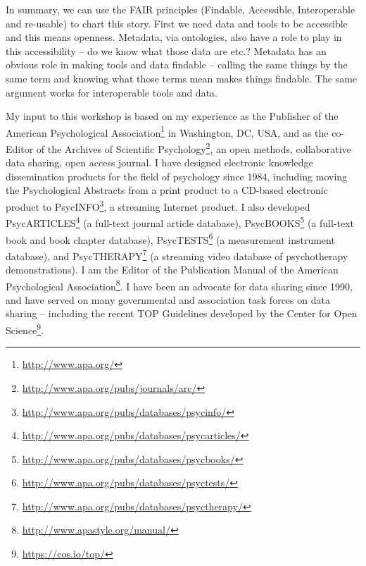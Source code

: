 \documentclass[a4paper,USenglish]{dagrep}
\begin{document}
In summary, we can use the FAIR principles (Findable, Accessible, Interoperable
and re-usable) to chart this story. First we need data and tools to be
accessible and this means openness. Metadata, via ontologies, also have a   role
to play in this accessibility – do we know what those data are etc.? Metadata
has an obvious role in making tools and data findable – calling the same things
by the same term and knowing what those terms mean makes things findable. The
same argument works for interoperable tools and data.



{}
\license
My input to this workshop is based on my experience as the Publisher of the
American Psychological Association\footnote{\url{http://www.apa.org/}} in
Washington, DC, USA, and as the co-Editor of the Archives of Scientific
Psychology\footnote{\url{http://www.apa.org/pubs/journals/arc/}}, an open
methods, collaborative data sharing, open access journal.  I have designed
electronic knowledge dissemination products for the field of psychology since
1984, including moving the Psychological Abstracts from a print product to a
CD-based electronic product to
PsycINFO\footnote{\url{http://www.apa.org/pubs/databases/psycinfo/}}, a
streaming Internet product.  I also developed
PsycARTICLES\footnote{\url{http://www.apa.org/pubs/databases/psycarticles/}} (a
full-text journal article database),
PsycBOOKS\footnote{\url{http://www.apa.org/pubs/databases/psycbooks/}} (a
full-text book and book chapter database),
PsycTESTS\footnote{\url{http://www.apa.org/pubs/databases/psyctests/}} (a
measurement instrument database), and
PsycTHERAPY\footnote{\url{http://www.apa.org/pubs/databases/psyctherapy/}} (a
streaming video database of psychotherapy demonstrations).  I am the Editor of
the Publication Manual of the American Psychological
Association\footnote{\url{http://www.apastyle.org/manual/}}.  I have been an
advocate for data sharing since 1990, and have served on many governmental and
association task forces on data sharing – including the recent TOP Guidelines
developed by the Center for Open Science\footnote{\url{https://cos.io/top/}}.   
\end{document}
